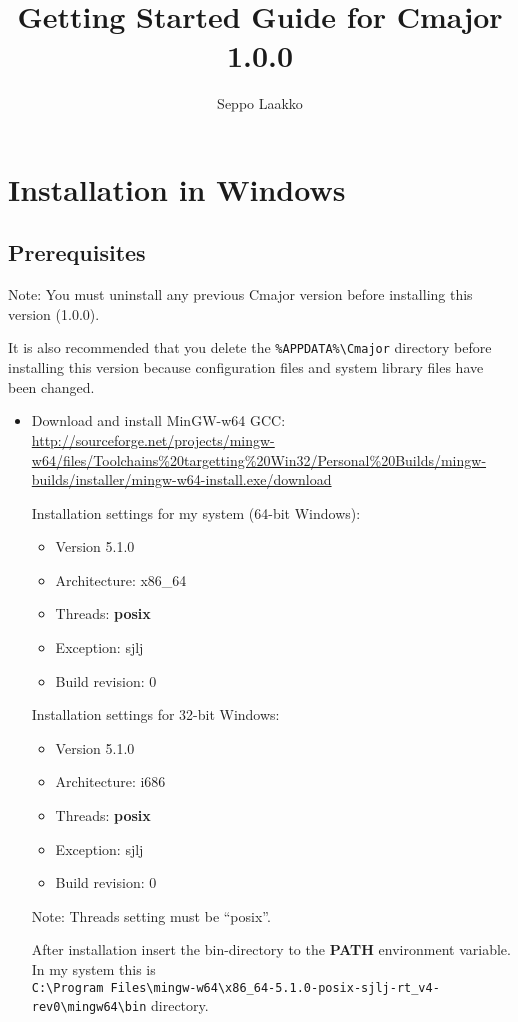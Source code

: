 \documentclass[oneside, a4paper, 11pt]{article}
\begin{document}
\title{Getting Started Guide for Cmajor 1.0.0}
\author{Seppo Laakko}
\maketitle

\section{Installation in Windows}

\subsection{Prerequisites}

Note:
You must uninstall any previous Cmajor version before installing
this version (1.0.0).

It is also recommended that you delete the
\verb|%APPDATA%\Cmajor| directory before installing
this version because configuration files and system library files
have been changed.

\begin{itemize}

\item
Download and install MinGW-w64 GCC:\\
\url{http://sourceforge.net/projects/mingw-w64/files/Toolchains%20targetting%20Win32/Personal%20Builds/mingw-builds/installer/mingw-w64-install.exe/download}

Installation settings for my system (64-bit Windows):
\begin{itemize}
\item
Version 5.1.0
\item
Architecture: x86\_64
\item
Threads: \textbf{posix}
\item
Exception: sjlj
\item
Build revision: 0
\end{itemize}

Installation settings for 32-bit Windows:
\begin{itemize}
\item
Version 5.1.0
\item
Architecture: i686
\item
Threads: \textbf{posix}
\item
Exception: sjlj
\item
Build revision: 0
\end{itemize}

Note: Threads setting must be ``posix''.

After installation insert the bin-directory to the \textbf{PATH} environment variable.
In my system this is\\
\verb|C:\Program Files\mingw-w64\x86_64-5.1.0-posix-sjlj-rt_v4-rev0\mingw64\bin| directory.

\end{itemize}
\end{document}
